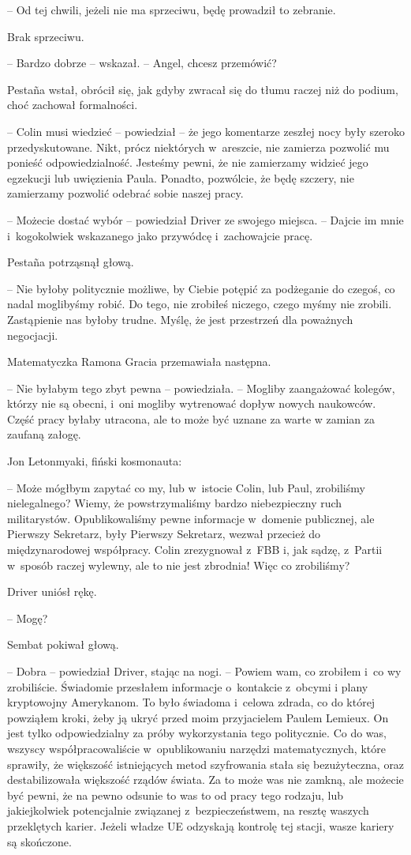 \documentclass[oneside,polish,12pt,sfheadings]{mwbk}
\begin{document}
-- Od tej chwili, jeżeli nie ma sprzeciwu, będę prowadził to zebranie.

Brak sprzeciwu.

-- Bardzo dobrze -- wskazał. -- Angel, chcesz przemówić?

Pestaña wstał, obrócił się, jak gdyby zwracał się do tłumu raczej niż do
podium, choć zachował formalności.

-- Colin musi wiedzieć -- powiedział -- że jego komentarze zeszłej nocy
były szeroko przedyskutowane. Nikt, prócz niektórych w~areszcie, nie
zamierza pozwolić mu ponieść odpowiedzialność. Jesteśmy pewni, że nie
zamierzamy widzieć jego egzekucji lub uwięzienia Paula. Ponadto,
pozwólcie, że będę szczery, nie zamierzamy pozwolić odebrać sobie naszej
pracy.

-- Możecie dostać wybór -- powiedział Driver ze swojego miejsca. -- Dajcie
im mnie i~kogokolwiek wskazanego jako przywódcę i~zachowajcie pracę.

Pestaña potrząsnął głową. 

-- Nie byłoby politycznie możliwe, by Ciebie
potępić za podżeganie do czegoś, co nadal moglibyśmy robić. Do tego, nie
zrobiłeś niczego, czego myśmy nie zrobili. Zastąpienie nas byłoby
trudne. Myślę, że jest przestrzeń dla poważnych negocjacji.

Matematyczka Ramona Gracia przemawiała następna.

-- Nie byłabym tego zbyt pewna -- powiedziała. -- Mogliby zaangażować
kolegów, którzy nie są obecni, i~oni mogliby wytrenować dopływ nowych
naukowców. Część pracy byłaby utracona, ale to może być uznane za warte
w zamian za zaufaną załogę.

Jon Letonmyaki, fiński kosmonauta: 

-- Może mógłbym zapytać co my, lub w~istocie Colin, lub Paul, zrobiliśmy nielegalnego? Wiemy, że
powstrzymaliśmy bardzo niebezpieczny ruch militarystów. Opublikowaliśmy
pewne informacje w~domenie publicznej, ale Pierwszy Sekretarz, były
Pierwszy Sekretarz, wezwał przecież do międzynarodowej współpracy. Colin
zrezygnował z~FBB i, jak sądzę, z~Partii w~sposób raczej wylewny, ale to
nie jest zbrodnia! Więc co zrobiliśmy?

Driver uniósł rękę. 

-- Mogę?

Sembat pokiwał głową.

-- Dobra -- powiedział Driver, stając na nogi. -- Powiem wam, co zrobiłem i~co wy zrobiliście. Świadomie przesłałem informacje o~kontakcie z~obcymi
i plany kryptowojny Amerykanom. To było świadoma i~celowa zdrada, co do
której powziąłem kroki, żeby ją ukryć przed moim przyjacielem Paulem
Lemieux. On jest tylko odpowiedzialny za próby wykorzystania tego
politycznie. Co do was, wszyscy współpracowaliście w~opublikowaniu
narzędzi matematycznych, które sprawiły, że większość istniejących metod
szyfrowania stała się bezużyteczna, oraz destabilizowała większość
rządów świata. Za to może was nie zamkną, ale możecie być pewni, że na
pewno odsunie to was to od pracy tego rodzaju, lub jakiejkolwiek
potencjalnie związanej z~bezpieczeństwem, na resztę waszych przeklętych
karier. Jeżeli władze UE odzyskają kontrolę tej stacji, wasze kariery są
skończone.
\end{document}
